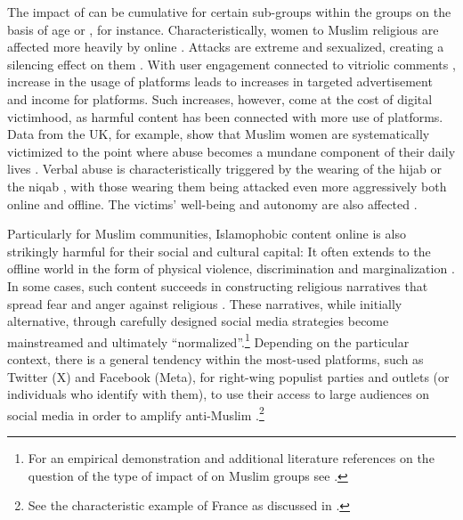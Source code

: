\documentclass[output=paper,colorlinks,citecolor=brown]{langscibook}
\begin{document}
The impact of  can be cumulative for certain sub-groups within the  groups on the basis of age or , for instance. Characteristically, women  to Muslim religious  are affected more heavily by online . Attacks are extreme and sexualized, creating a silencing effect on them \citep{ballon_vikmane2021}. With user engagement connected to vitriolic comments \citep{wall_street_journal2018}, increase in the usage of platforms leads to increases in targeted advertisement and income for platforms. Such increases, however, come at the cost of digital victimhood, as harmful content has been connected with more use of platforms. Data from the UK, for example, show that Muslim women are systematically victimized to the point where abuse becomes a mundane component of their daily lives \citep[33]{hargreaves2015}. Verbal abuse is characteristically triggered by the wearing of the hijab or the niqab \citep[121]{allen2021}, with those wearing them being attacked even more aggressively both online and offline. The victims' well-being and autonomy are also affected \citep{awan_zempi2015_virtual_physical,awan_zempi2016_affinity}. 

Particularly for Muslim communities, Islamophobic content online is also strikingly harmful for their social and cultural capital: It often extends to the offline world in the form of physical violence, discrimination and marginalization \citep{perrigo2020}. In some cases, such content succeeds in constructing religious narratives that spread fear and anger against religious  \citep[20]{evolvi2022}. These narratives, while initially alternative, through carefully designed social media strategies become mainstreamed and ultimately ``normalized''.\footnote{%
For an empirical demonstration and additional literature references on the question of the type of impact of  on Muslim groups see \citet{schmuck_matthes_paul2017}.} 
Depending on the particular context, there is a general tendency within the most-used platforms, such as Twitter (X) and Facebook (Meta), for right-wing populist parties and outlets (or individuals who identify with them), to use their access to large audiences on social media in order to amplify anti-Muslim .\footnote{%
See the characteristic example of France as discussed in \citet{guerin_fourel2021}.}
\end{document}
